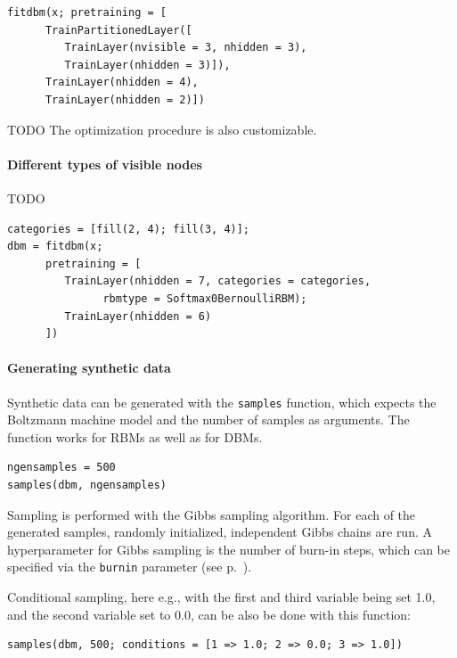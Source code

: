 \documentclass[12pt]{article}
\newcommand{\inlinecode}[1]{\texttt{#1}}
\begin{document}
\begin{lstlisting}[caption={Fitting a partitioned DBM},label={lst:partdbm}]
fitdbm(x; pretraining = [
      TrainPartitionedLayer([
         TrainLayer(nvisible = 3, nhidden = 3), 
         TrainLayer(nhidden = 3)]),
      TrainLayer(nhidden = 4),
      TrainLayer(nhidden = 2)])
\end{lstlisting}


TODO The optimization procedure is also customizable. 


\paragraph{Different types of visible nodes}

TODO

\begin{lstlisting}
categories = [fill(2, 4); fill(3, 4)];
dbm = fitdbm(x;
      pretraining = [
         TrainLayer(nhidden = 7, categories = categories,
               rbmtype = Softmax0BernoulliRBM);
         TrainLayer(nhidden = 6)
      ])
\end{lstlisting}

\paragraph{Generating synthetic data}\label{usagesampling}
Synthetic data can be generated with the \inlinecode{samples} function, which expects the Boltzmann machine model and the number of samples as arguments.
The function works for RBMs as well as for DBMs.

\begin{lstlisting}
ngensamples = 500
samples(dbm, ngensamples)
\end{lstlisting}

Sampling is performed with the Gibbs sampling algorithm.
For each of the generated samples, randomly initialized, independent Gibbs chains are run.
A hyperparameter for Gibbs sampling is the number of burn-in steps, which can be specified via the \inlinecode{burnin} parameter (see p.\ \pageref{bms_samples}).

Conditional sampling, here e.g., with the first and third variable being set 1.0, and the second variable set to 0.0, can be also be done with this function:

\begin{lstlisting}
samples(dbm, 500; conditions = [1 => 1.0; 2 => 0.0; 3 => 1.0])
\end{lstlisting}
\end{document}
